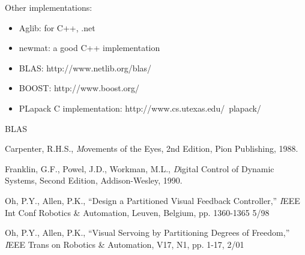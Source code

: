 Other implementations:
\begin{itemize}
\item Aglib: for C++, .net
\item newmat: a good C++ implementation
\item BLAS: http://www.netlib.org/blas/
\item BOOST: http://www.boost.org/ 
\item PLapack C implementation: http://www.cs.utexas.edu/~plapack/
\end{itemize}

BLAS

\begin{thebibliography}{99}

 Carpenter, R.H.S., {\textit Movements of the Eyes},
 2nd Edition, Pion Publishing, 1988.

 Franklin, G.F., Powel, J.D., Workman, M.L.,
{\textit Digital Control of Dynamic Systems}, Second Edition,
Addison-Wesley, 1990.

 Oh, P.Y., Allen, P.K., ``Design a Partitioned
 Visual Feedback Controller,'' {\textit IEEE Int Conf Robotics
 \& Automation}, Leuven, Belgium, pp. 1360-1365 5/98

 Oh, P.Y., Allen, P.K., ``Visual Servoing
 by Partitioning Degrees of Freedom,'' {\textit IEEE Trans on 
 Robotics \& Automation}, V17, N1, pp. 1-17, 2/01

\end{thebibliography}
